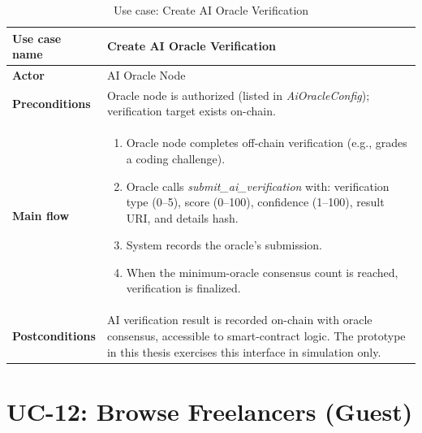 \begin{table}[H]
\centering
\caption{Use case: Create AI Oracle Verification}
\begin{tabular}{|l|p{10cm}|}
\hline
\textbf{Use case name} & Create AI Oracle Verification \\ \hline
\textbf{Actor} & AI Oracle Node \\ \hline
\textbf{Preconditions} & Oracle node is authorized (listed in \emph{AiOracleConfig}); verification target exists on-chain. \\ \hline
\textbf{Main flow} & \begin{enumerate}[noitemsep]
    \item Oracle node completes off-chain verification (e.g., grades a coding challenge).
    \item Oracle calls \emph{submit\_ai\_verification} with: verification type (0--5), score (0--100), confidence (1--100), result URI, and details hash.
    \item System records the oracle's submission.
    \item When the minimum-oracle consensus count is reached, verification is finalized.
\end{enumerate} \\ \hline
\textbf{Postconditions} & AI verification result is recorded on-chain with oracle consensus, accessible to smart-contract logic. The prototype in this thesis exercises this interface in simulation only. \\ \hline
\end{tabular}
\end{table}

\section*{UC-12: Browse Freelancers (Guest)}

